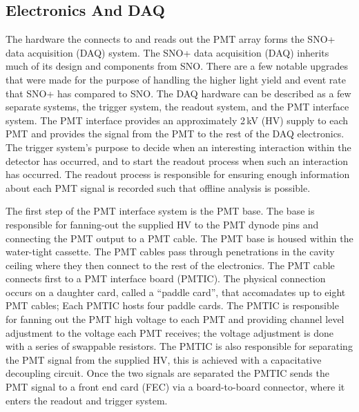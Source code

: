 


\subsection{Electronics And DAQ}
The hardware the connects to and reads out the PMT array forms the SNO+ data acquisition (DAQ)
system\@.
The SNO+ data acquisition (DAQ) inherits much of its design and components from
SNO\@.
There are a few notable upgrades that were made for the purpose of handling the
higher light yield and event rate that SNO+ has compared to SNO\@.
The DAQ hardware can be described as a few separate systems, the trigger system,
the readout system, and the PMT interface system.
The PMT interface provides an approximately 2\,kV (HV) supply to each PMT and provides
the signal from the PMT to the rest of the DAQ electronics.
The trigger system's purpose to decide when an interesting interaction
within the detector has occurred, and to start the readout process when such an
interaction has occurred.
The readout process is responsible for ensuring enough information about each
PMT signal is recorded such that offline analysis is possible.

The first step of the PMT interface system is the PMT base. The base is responsible
for fanning-out the supplied HV to the PMT dynode pins and connecting the PMT output
to a PMT cable. The PMT base is housed within the water-tight cassette.
The PMT cables pass through penetrations in the cavity ceiling where they then connect
to the rest of the electronics. The PMT cable connects first to a PMT interface
board (PMTIC). The physical connection occurs on a daughter card, called a ``paddle card'',
that accomadates up to eight PMT cables; Each PMTIC hosts four paddle cards.
The PMTIC is responsible for fanning out the PMT high voltage
to each PMT and providing channel level adjustment to the voltage
each PMT receives; the voltage adjustment is done with a series of
swappable resistors.
The PMTIC is also responsible for separating the PMT signal from the supplied
HV, this is achieved with a capacitative decoupling circuit.
Once the two signals are separated the PMTIC sends the PMT signal to
a front end card (FEC) via a board-to-board connector, where it enters
the readout and trigger system.


